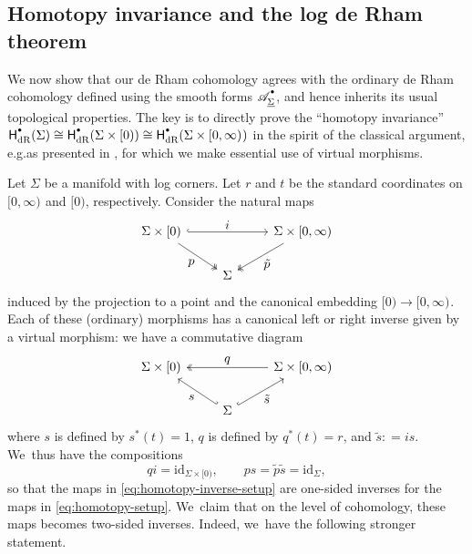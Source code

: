 \documentclass[10pt]{amsart}
\let\oldbullet\bullet
\renewcommand{\bullet}{{\raisebox{1pt}{$\scriptscriptstyle\oldbullet$}}}
\let\tst\textstyle
\theoremstyle{definition}
\theoremstyle{remark}
\newcommand{\halfspc}[1]{[0,\infty)^{#1}}
\newcommand{\id}[1]{\mathrm{id}_{#1}}
\newcommand{\tp}{\tilde p}
\newcommand{\ts}{\tilde s}
\newcommand{\defas}{\mathrel{\mathop:}=}
\newcommand{\rbrac}[1]{\left(#1\right)}
\newcommand{\cA}[2][\bullet]{\mathscr{A}^{#1}_{#2}}\newcommand{\A}[2][\bullet] {\mathscr{A}^{#1}\rbrac{#2}}
\newcommand{\Sig}{\Sigma}
\newcommand{\uSig}{\underline{\Sigma}}
\newcommand{\HdR}[2][\bullet]{\mathsf{H}_{\mathrm{dR}}^{#1}(#2)}
\providecommand{\eg}{e.g.}\providecommand{\ie}{i.e.}
\begin{document}
\subsection{Homotopy invariance and the log de Rham theorem}\label{sec:poincare}

We now show that our de Rham cohomology agrees with the ordinary de Rham cohomology defined using the smooth forms $\cA{\uSig}$, and hence inherits its usual topological properties. The key is to directly prove the ``homotopy invariance'' $\HdR{\Sig} \cong \HdR{\Sig\times[0)} \cong \HdR{\Sig\times\halfspc{}}$ in the spirit of the classical argument, \eg as presented in \cite[\S{}I.4]{Bott1982}, for which we make essential use of virtual morphisms.

Let $\Sig$ be a manifold with log corners. Let $r$ and $t$ be the standard coordinates on $\halfspc{}$ and $[0)$, respectively. Consider the natural maps\vspace*{-5pt}
\begin{equation}\label{eq:homotopy-setup}
\begin{tikzcd}
\Sig \times [0) \ar[rr,"\tst i",hook]\ar[rd,"\tst p"',twoheadrightarrow] & &\Sig\times \halfspc{} \ar[ld,"\tst \tp",twoheadrightarrow] \\
& \Sig
\end{tikzcd}
\end{equation}
induced by the projection to a point and the canonical embedding $[0) \to \halfspc{}$. Each of these (ordinary) morphisms has a canonical left or right inverse given by a virtual morphism: we have a commutative diagram\vspace*{-5pt}
\begin{equation}
\begin{tikzcd}
\Sig \times [0) & &\Sig\times \halfspc{} \ar[ll,"\tst q"',twoheadrightarrow] \\
& \Sig \ar[ul,"\tst s",hook'] \ar[ur,"\tst \ts"',hook]
\end{tikzcd} \label{eq:homotopy-inverse-setup}
\end{equation}
where $s$ is defined by $s^*(t)=1$, $q$ is defined by $q^*(t)=r$, and $\tilde s\defas is$. We~thus have the compositions\vspace*{-5pt}
\[
q i= \id{\Sig \times [0)},\qquad ps =\tilde p\tilde s = \id{\Sig},
\]
so that the maps in \eqref{eq:homotopy-inverse-setup} are one-sided inverses for the maps in \eqref{eq:homotopy-setup}. We~claim that on the level of cohomology, these maps becomes two-sided inverses. Indeed, we~have the following stronger statement.
\end{document}
